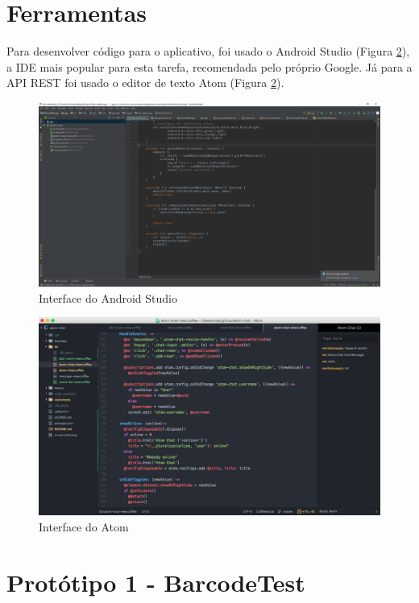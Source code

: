 \section{Ferramentas}

Para desenvolver código para o aplicativo, foi usado o Android Studio (Figura \ref{devfig02}), a IDE mais popular para esta tarefa, recomendada pelo próprio Google. Já para a API REST foi usado o editor de texto Atom (Figura \ref{devfig02}).

\begin{figure}[ht!]
	\centering
    \includegraphics[width=\textwidth]{Cap3/androidstudio}
    \caption{Interface do Android Studio}
    \label{devfig01}
\end{figure}

\begin{figure}[ht!]
	\centering
    \includegraphics[width=\textwidth]{Cap3/atom}
    \caption{Interface do Atom}
    \label{devfig02}
\end{figure}

\section{Protótipo 1 - BarcodeTest}

